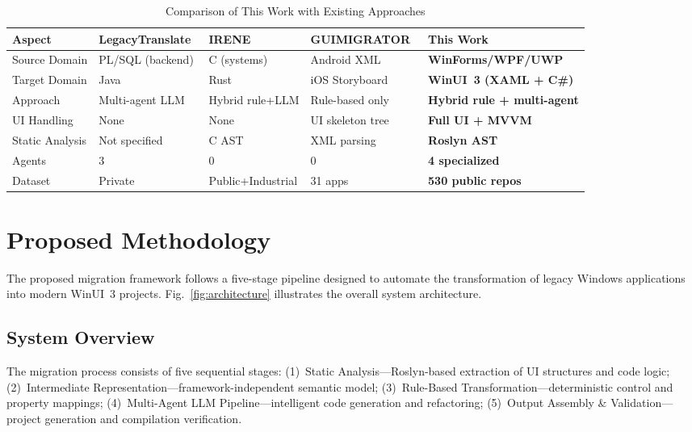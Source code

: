 \documentclass[conference]{IEEEtran}
\begin{document}
\begin{table}[t]
\caption{Comparison of This Work with Existing Approaches}
\label{tab:comparison}
\centering
\footnotesize
\begin{tabular}{p{2.2cm}p{2.2cm}p{1.8cm}p{2cm}p{2.8cm}}
\toprule
\textbf{Aspect} & \textbf{LegacyTranslate~\cite{moti2026}} & \textbf{IRENE~\cite{luo2025}} & \textbf{GUIMIGRATOR~\cite{gao2024}} & \textbf{This Work} \\
\midrule
Source Domain & PL/SQL (backend) & C (systems) & Android XML & \textbf{WinForms/WPF/UWP} \\
Target Domain & Java & Rust & iOS Storyboard & \textbf{WinUI~3 (XAML + C\#)} \\
Approach & Multi-agent LLM & Hybrid rule+LLM & Rule-based only & \textbf{Hybrid rule + multi-agent} \\
UI Handling & None & None & UI skeleton tree & \textbf{Full UI + MVVM} \\
Static Analysis & Not specified & C AST & XML parsing & \textbf{Roslyn AST} \\
Agents & 3 & 0 & 0 & \textbf{4 specialized} \\
Dataset & Private & Public+Industrial & 31 apps & \textbf{530 public repos} \\
\bottomrule
\end{tabular}
\end{table}

\section{Proposed Methodology}

The proposed migration framework follows a five-stage pipeline designed to automate the transformation of legacy Windows applications into modern WinUI~3 projects. Fig.~\ref{fig:architecture} illustrates the overall system architecture.

\subsection{System Overview}

The migration process consists of five sequential stages: (1)~Static Analysis---Roslyn-based extraction of UI structures and code logic; (2)~Intermediate Representation---framework-independent semantic model; (3)~Rule-Based Transformation---deterministic control and property mappings; (4)~Multi-Agent LLM Pipeline---intelligent code generation and refactoring; (5)~Output Assembly \& Validation---project generation and compilation verification.
\end{document}
